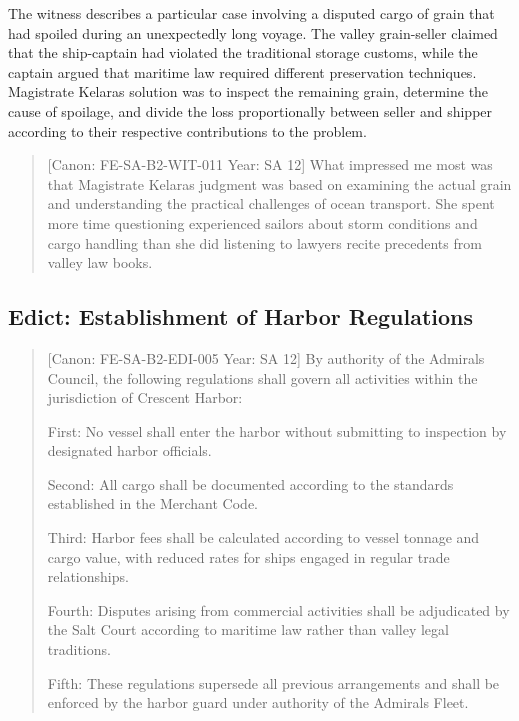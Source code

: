 The witness describes a particular case involving a disputed cargo of
grain that had spoiled during an unexpectedly long voyage. The valley
grain-seller claimed that the ship-captain had violated the traditional
storage customs, while the captain argued that maritime law required
different preservation techniques. Magistrate Kelara\textquotesingle s
solution was to inspect the remaining grain, determine the cause of
spoilage, and divide the loss proportionally between seller and shipper
according to their respective contributions to the problem.

\begin{quote}
{[}Canon: FE-SA-B2-WIT-011 \textbar{} Year: SA 12{]} What impressed me
most was that Magistrate Kelara\textquotesingle s judgment was based on
examining the actual grain and understanding the practical challenges of
ocean transport. She spent more time questioning experienced sailors
about storm conditions and cargo handling than she did listening to
lawyers recite precedents from valley law books.
\end{quote}

\subsection{Edict: Establishment of Harbor
Regulations}\label{edict-establishment-of-harbor-regulations}

\begin{quote}
{[}Canon: FE-SA-B2-EDI-005 \textbar{} Year: SA 12{]} By authority of the
Admiral\textquotesingle s Council, the following regulations shall
govern all activities within the jurisdiction of Crescent Harbor:

First: No vessel shall enter the harbor without submitting to inspection
by designated harbor officials.

Second: All cargo shall be documented according to the standards
established in the Merchant Code.

Third: Harbor fees shall be calculated according to vessel tonnage and
cargo value, with reduced rates for ships engaged in regular trade
relationships.

Fourth: Disputes arising from commercial activities shall be adjudicated
by the Salt Court according to maritime law rather than valley legal
traditions.

Fifth: These regulations supersede all previous arrangements and shall
be enforced by the harbor guard under authority of the
Admiral\textquotesingle s Fleet.
\end{quote}

